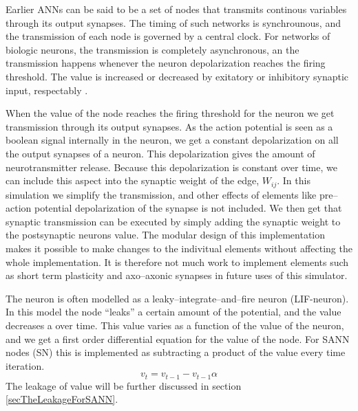 	Earlier ANNs can be said to be a set of nodes that transmits continous variables through its output synapses. The timing of such networks is synchrounous, and the transmission of each node is governed by a central clock.
	For networks of biologic neurons, the transmission is completely asynchronous, an the transmission happens whenever the neuron depolarization reaches the firing threshold.
	The value is increased or decreased by exitatory or inhibitory synaptic input, respectably .
	
	When the value of the node reaches the firing threshold for the neuron we get transmission through its output synapses.
	As the action potential is seen as a boolean signal internally in the neuron, we get a constant depolarization on all the output synapses of a neuron.
	This depolarization gives the amount of neurotransmitter release. 
	Because this depolarization is constant over time, we can include this aspect into the synaptic weight of the edge, $W_{ij}$.
	In this simulation we simplify the transmission, and other effects of elements like pre--action potential depolarization of the synapse is not included.%
	We then get that synaptic transmission can be executed by simply adding the synaptic weight to the postsynaptic neurons value.
	The modular design of this implementation makes it possible to make changes to the indivitual elements without affecting the whole implementation.
	It is therefore not much work to implement elements such as short term plasticity and axo--axonic synapses in future uses of this simulator.

	The neuron is
					 often modelled as a leaky--integrate--and--fire neuron (LIF-neuron). %
	In this model the node ``leaks'' a certain amount of the potential, and the value decreases a over time. 
	This value varies as a function of the value of the neuron, and we get a first order differential equation for the value of the node.
	For SANN nodes (SN) this is implemented as subtracting a product of the value every time iteration. 
	\begin{equation}
	v_t = v_{t-1} - v_{t-1}  \alpha %
	\end{equation}
	The leakage of value will be further discussed in section \ref{secTheLeakageForSANN}.

